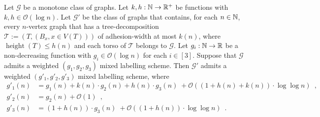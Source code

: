 \documentclass{patmorin}
\renewcommand{\le}{\leqslant}
\newcommand{\pat}[1]{\textcolor{Magenta}{PaMo: #1}}
\newcommand{\piotr}[1]{\textcolor{red}{PiMi: #1}}
\DeclareMathOperator{\height}{height}
\newcommand{\Oh}{\mathcal{O}}
\begin{document}
  \begin{lem}\label{small_height}
  Let $\mathcal{G}$ be a monotone class of graphs.
  Let $k,h:\mathbb{N}\to\mathbb{R}^+$ be functions with $k,h\in \Oh(\log n)$.
  Let $\mathcal{G'}$ be the class of graphs that contains, for each $n\in\mathbb{N}$, every $n$-vertex graph that has a tree-decomposition $\mathcal{T}:=(T,(B_x,x\in V(T)))$ of adhesion-width at most $k(n)$, where $\height(T)\le h(n)$ and each torso of $\mathcal{T}$ belongs to $\mathcal{G}$.
     Let $g_i:\mathbb{N}\to\mathbb{R}$ be a non-decreasing function  with $g_i\in\Oh(\log n)$ for each $i\in[3]$.
     Suppose that $\mathcal{G}$ admits a weighted $(g_1,g_2,g_3)$ mixed labelling scheme.
     Then $\mathcal{G}'$ admits a weighted $(g'_1,g'_2,g'_3)$ mixed labelling scheme, where
     \begin{align*}
       g'_1(n) & = g_1(n)
             + k(n)\cdot g_2(n)
            + h(n)\cdot g_3(n)  \; {} + \Oh((1+h(n)+k(n))\cdot\log\log n)\enspace,\\
       g'_2(n) & = g_2(n) + \Oh(1)\enspace, \\
       g'_3(n) & = (1+h(n))\cdot g_3(n)  \; {}   + \Oh((1+h(n))\cdot\log\log n)\enspace.
     \end{align*}
  \end{lem}
\end{document}
